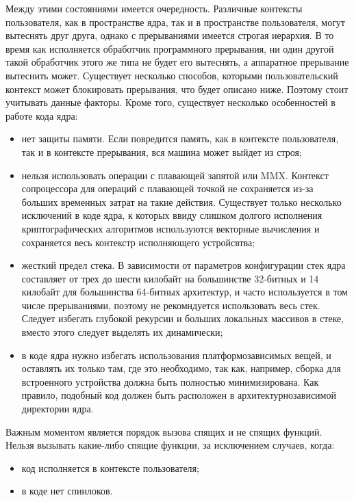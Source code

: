 Между этими состояниями имеется очередность. Различные контексты пользователя,
как в пространстве ядра, так и в пространстве пользователя, могут вытеснять друг
друга, однако с прерываниями имеется строгая иерархия. В то время как
исполняется обработчик программного прерывания, ни один другой такой обработчик
этого же типа не будет его вытеснять, а аппаратное прерывание вытеснить может.
Существует несколько способов, которыми пользовательский контекст может
блокировать прерывания, что будет описано ниже. Поэтому стоит учитывать данные
факторы. Кроме того, существует несколько особенностей в работе кода ядра:
\begin{itemize}
\item нет защиты памяти. Если повредится память, как в контексте пользователя,
  так и в контексте прерывания, вся машина может выйдет из строя;
\item нельзя использовать операции с плавающей запятой или MMX. Контекст
  сопроцессора для операций с плавающей точкой не сохраняется из-за больших
  временных затрат на такие действия. Существует только несколько исключений в
  коде ядра, к которых ввиду слишком долгого исполнения криптографических
  алгоритмов используются векторные вычисления и сохраняется весь контекстр
  исполняющего устройсвтва;
\item жесткий предел стека. В зависимости от параметров конфигурации стек ядра
  составляет от трех до шести килобайт на большинстве 32-битных и 14 килобайт
  для большинства 64-битных архитектур, и часто используется в том числе
  прерываниями, поэтому не рекомндуется использовать весь стек. Следует избегать
  глубокой рекурсии и больших локальных массивов в стеке, вместо этого следует
  выделять их динамически;
\item в коде ядра нужно избегать использования платформозависимых вещей, и
  оставлять их только там, где это необходимо, так как, например, сборка для
  встроенного устройства должна быть полностью минимизирована. Как правило,
  подобный код должен быть расположен в архитектурнозависимой директории ядра.
\end{itemize}

Важным моментом является порядок вызова спящих и не спящих функций. Нельзя
вызывать какие-либо спящие функции, за исключением случаев, когда:
\begin{itemize}
\item код исполняется в контексте пользователя;
\item в коде нет спинлоков.
\end{itemize}

